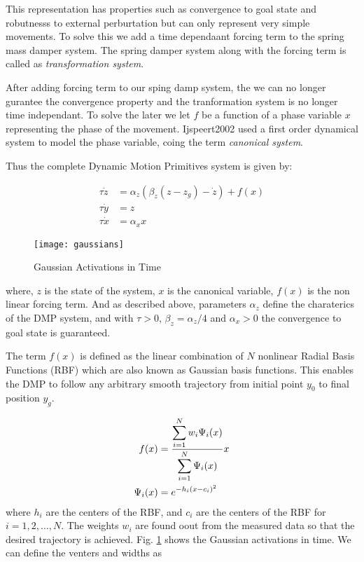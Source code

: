 This representation has properties such as convergence to goal state and robutnesss to external perburtation but
can only represent very simple movements. To solve this we add a time dependaant forcing term to the spring mass damper system. The spring damper system
along with the forcing term is called as \textit{transformation system}.

After adding forcing term to our sping damp system, the we can no longer gurantee the convergence property and the tranformation system is no longer time independant.
To solve the later we let $f$ be a function of a phase variable $x$ representing the phase of the movement. Ijspeert2002  used a first order dynamical system
to model the phase variable, coing the term \textit{canonical system}.

Thus the complete Dynamic Motion Primitives system is given by:

\begin{subequations}\label{eq:dmpSystem}
    
    \begin{align}
        \tau \dot{z}& = \alpha_z (\beta_z \left( z - z_g \right) - \dot{z}) + f(x)\label{Tsystem}\\
        \tau \dot{y}& = z \\
        \tau \dot{x}& = \alpha_x x\label{cSystem}
    \end{align}
\end{subequations}

\begin{figure}[h]
    \centering
    \texttt{[image: gaussians]}
    \caption{Gaussian Activations in Time}
    \label{fig:gaussians}
\end{figure}
where, $z$ is the state of the system, $x$ is the canonical variable, $f(x)$ is the non linear forcing term. And as described above, parameters
$\alpha_z$ define the charaterics of the DMP system, and with $\tau > 0 $, $\beta_z =  \alpha_z/4$ and $\alpha_x >0$ the convergence to 
goal state is guaranteed.

The term $f(x)$ is defined as the linear combination of $N$ nonlinear Radial Basis Functions (RBF) which are also known as Gaussian basis functions.
This enables the DMP to follow any arbitrary smooth trajectory from initial point $y_0$ to final position $y_g$.

\begin{align}\label{eq:dmp_rbf}
    f(x) &= \frac{\displaystyle \sum\limits_{i=1}^{N} w_i \Psi_i(x)}{\displaystyle \sum\limits_{i=1}^N \Psi_i(x)}  x\\
    \Psi_i(x) &= e^{-h_i(x-c_i)^2}
\end{align}
where $h_i$ are the centers of the RBF, and $c_i$ are the centers of the RBF for $i = 1,2, \dots , N$. The weights $w_i$ are found oout from the measured 
data so that the desired trajectory is achieved. Fig. \ref{fig:gaussians} shows the Gaussian activations in time.
We can define the venters and widths as



